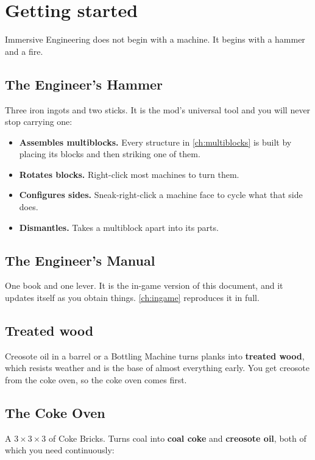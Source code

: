 \chapter{Getting started}
\label{ch:getting-started}

Immersive Engineering does not begin with a machine. It begins with a hammer and a fire.

\section{The Engineer's Hammer}

Three iron ingots and two sticks. It is the mod's universal tool and you will never stop carrying
one:

\begin{itemize}
\item \textbf{Assembles multiblocks.} Every structure in \autoref{ch:multiblocks} is built by
      placing its blocks and then striking one of them.
\item \textbf{Rotates blocks.} Right-click most machines to turn them.
\item \textbf{Configures sides.} Sneak-right-click a machine face to cycle what that side does.
\item \textbf{Dismantles.} Takes a multiblock apart into its parts.
\end{itemize}

\section{The Engineer's Manual}

One book and one lever. It is the in-game version of this document, and it updates itself as you
obtain things. \autoref{ch:ingame} reproduces it in full.

\section{Treated wood}

Creosote oil in a barrel or a Bottling Machine turns planks into \textbf{treated wood}, which
resists weather and is the base of almost everything early. You get creosote from the coke oven, so
the coke oven comes first.

\section{The Coke Oven}

A $3\times3\times3$ of Coke Bricks. Turns coal into \textbf{coal coke} and \textbf{creosote oil},
both of which you need continuously:

